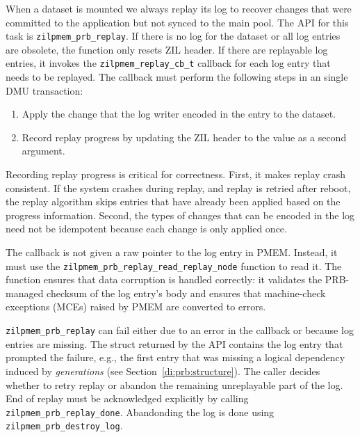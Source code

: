 \documentclass[12pt,a4paper,twoside]{book}
\begin{document}
When a dataset is mounted we always replay its log to recover changes that were committed to the application but not synced to the main pool.
The API for this task is \lstinline{zilpmem_prb_replay}.
If there is no log for the dataset or all log entries are obsolete, the function only resets ZIL header.
If there are replayable log entries, it invokes the \lstinline{zilpmem_replay_cb_t} callback for each log entry that needs to be replayed.
The callback must perform the following steps in an single DMU transaction:
\begin{enumerate}[noitemsep]
    \item Apply the change that the log writer encoded in the entry to the dataset.
    \item Record replay progress by updating the ZIL header to the value as a second argument.
\end{enumerate}
Recording replay progress is critical for correctness.
First, it makes replay crash consistent.
If the system crashes during replay, and replay is retried after reboot, the replay algorithm skips entries that have already been applied based on the progress information.
Second, the types of changes that can be encoded in the log need not be idempotent because each change is only applied once.

The callback is not given a raw pointer to the log entry in PMEM.
Instead, it must use the \lstinline{zilpmem_prb_replay_read_replay_node} function to read it.
The function ensures that data corruption is handled correctly:
it validates the PRB-managed checksum of the log entry's body and ensures that machine-check exceptions (MCEs) raised by PMEM are converted to errors.

\lstinline{zilpmem_prb_replay} can fail either due to an error in the callback or because log entries are missing.
The struct returned by the API contains the log entry that prompted the failure, e.g., the first entry that was missing a logical dependency induced by \textit{generations} (see Section~\ref{di:prb:structure}).
The caller decides whether to retry replay or abandon the remaining unreplayable part of the log.
End of replay must be acknowledged explicitly by calling \lstinline{zilpmem_prb_replay_done}.
Abandonding the log is done using \lstinline{zilpmem_prb_destroy_log}.

\end{document}

